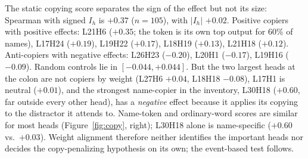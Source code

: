 \documentclass[11pt,a4paper]{article}
\begin{document}
The static copying score separates the sign of the effect but not its size: Spearman
with signed $I_h$ is $+0.37$ ($n=105$), with $|I_h|$ $+0.02$. Positive copiers with
positive effects: L21H6 ($+0.35$; the token is its own top output for 60\% of names),
L17H24 ($+0.19$), L19H22 ($+0.17$), L18H19 ($+0.13$), L21H18 ($+0.12$). Anti-copiers
with negative effects: L26H23 ($-0.20$), L20H1 ($-0.17$), L19H16 ($-0.09$). Random
controls lie in $[-0.044,+0.044]$. But the two largest heads at the colon are not
copiers by weight (L27H6 $+0.04$, L18H18 $-0.08$), L17H1 is neutral ($+0.01$), and the
strongest name-copier in the inventory, L30H18 ($+0.60$, far outside every other head),
has a \emph{negative} effect because it applies its copying to the distractor it
attends to. Name-token and ordinary-word scores are similar for most heads
(Figure~\ref{fig:copy}, right); L30H18 alone is name-specific ($+0.60$ vs.\ $+0.03$).
Weight alignment therefore neither identifies the important heads nor decides the
copy-penalizing hypothesis on its own; the event-based test follows.
\end{document}
